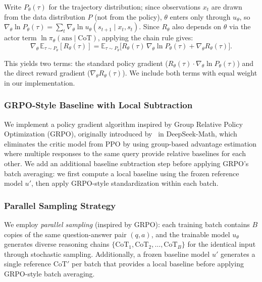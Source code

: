 \documentclass{article} %
\begin{document}
Write $P_\theta(\tau)$ for the trajectory distribution; since observations $x_t$ are drawn from the data distribution $P$ (not from the policy), $\theta$ enters only through $u_\theta$, so $\nabla_\theta \ln P_\theta(\tau) = \sum_t \nabla_\theta \ln u_\theta(s_{t+1}\mid x_t, s_t)$. Since $R_\theta$ also depends on $\theta$ via the actor term $\ln \pi_\theta(\text{ans}\mid\text{CoT})$, applying the chain rule gives:
\[\nabla_\theta \,\mathbb{E}_{\tau \sim P_\theta}[R_\theta(\tau)]
= \mathbb{E}_{\tau \sim P_\theta}\!\big[R_\theta(\tau)\, \nabla_\theta \ln P_\theta(\tau) + \nabla_\theta R_\theta(\tau)\big].\]

This yields two terms: the standard policy gradient ($R_\theta(\tau) \cdot \nabla_\theta \ln P_\theta(\tau)$) and the direct reward gradient ($\nabla_\theta R_\theta(\tau)$). We include both terms with equal weight in our implementation.

\subsubsection{GRPO-Style Baseline with Local Subtraction}
We implement a policy gradient algorithm inspired by Group Relative Policy Optimization (GRPO), originally introduced by~\cite{shao2024deepseekmath} in DeepSeek-Math, which eliminates the critic model from PPO by using group-based advantage estimation where multiple responses to the same query provide relative baselines for each other. We add an additional baseline subtraction step before applying GRPO's batch averaging: we first compute a local baseline using the frozen reference model $u'$, then apply GRPO-style standardization within each batch.

\subsubsection{Parallel Sampling Strategy}
\label{subsubsec:parallel}
We employ \emph{parallel sampling} (inspired by GRPO): each training batch contains $B$ copies of the same question-answer pair $(q, a)$, and the trainable model $u_\theta$ generates diverse reasoning chains $\{\text{CoT}_1, \text{CoT}_2, \ldots, \text{CoT}_B\}$ for the identical input through stochastic sampling. Additionally, a frozen baseline model $u'$ generates a single reference $\text{CoT}'$ per batch that provides a local baseline before applying GRPO-style batch averaging.
\end{document}
